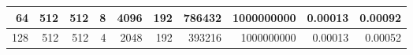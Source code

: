 \documentclass[journal,transmag]{IEEEtran}
\begin{document}
\begin{table}[h]
\begin{tabular}{|r|r|r|r|r|r|r|r|r|r|}
			64                          & 512                        & 512                         & 8                               & 4096                                 & 192                                  & 786432                                 & 1000000000                            & 0.00013                         & 0.00092                       \\ \hline
			128                         & 512                        & 512                         & 4                               & 2048                                 & 192                                  & 393216                                 & 1000000000                            & 0.00013                         & 0.00052                       \\ \hline
		\end{tabular}
	\end{table}
\end{document}
